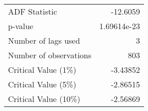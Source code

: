 \begin{tabular}{lr}
\toprule
 ADF Statistic          & -12.6059      \\
 p-value                &   1.69614e-23 \\
 Number of lags used    &   3           \\
 Number of observations & 803           \\
 Critical Value (1\%)    &  -3.43852     \\
 Critical Value (5\%)    &  -2.86515     \\
 Critical Value (10\%)   &  -2.56869     \\
\bottomrule
\end{tabular}